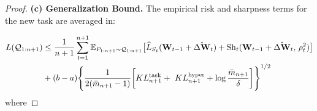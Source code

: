 \documentclass[letterpaper]{article} %
\begin{document}
\begin{proof}
\textbf{(c) Generalization Bound.}
    The empirical risk and sharpness terms for the new task are averaged in:


\begin{align}
 L(\mathcal{Q}_{1:n+1}) &\leq \frac{1}{n+1} \sum_{t=1}^{n+1}
    \mathbb{E}_{P_{1:n+1} \sim \mathcal{Q}_{1:n+1}}\big[
        \widehat{L}_{S_t}(\mathbf{W}_{t-1} + \hat{\Delta\mathbf{W}}_t) 
    + \mathrm{Sh}_t(\mathbf{W}_{t-1} + \hat{\Delta\mathbf{W}}_t,\, \rho_t^2)
    \big] \notag \\
&+ (b-a) \Bigg\{
        \frac{1}{2(\bar{m}_{n+1} - 1)} \bigg[
            KL_{n+1}^{\text{task}} \notag 
            +\ KL_{n+1}^{\text{hyper}} 
            + \log\frac{\bar{m}_{n+1}}{\delta}
        \bigg]
    \Bigg\}^{1/2}
\end{align}
where

    

\end{proof}
\end{document}

